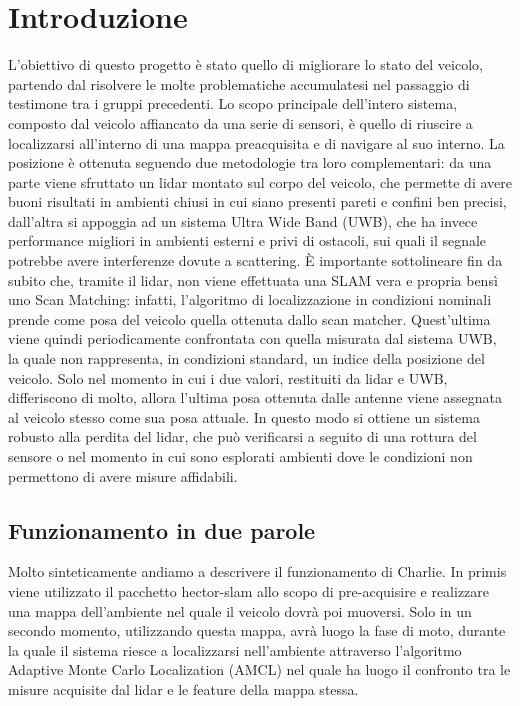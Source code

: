 
\graphicspath{{./figs/}}


	


\newpage\null\thispagestyle{empty}\newpage
\newpage
{}
\setcounter{page}{1}
\tableofcontents
\newpage

%
%


\section*{Introduzione}
L'obiettivo di questo progetto \`e stato quello di migliorare lo stato del veicolo, partendo dal risolvere le molte problematiche accumulatesi nel passaggio di testimone tra i gruppi precedenti.
Lo scopo principale dell'intero sistema, composto dal veicolo affiancato da una serie di sensori, \`e quello di riuscire a localizzarsi all'interno di una mappa 
preacquisita e di navigare al suo interno.
La posizione \`e ottenuta seguendo due metodologie tra loro complementari: da una parte viene sfruttato un lidar montato sul corpo del veicolo, che permette di 
avere buoni risultati in ambienti chiusi in cui siano presenti pareti e confini ben precisi, dall'altra si appoggia ad un sistema Ultra Wide Band (UWB), che ha 
invece performance migliori in ambienti esterni e privi di ostacoli, sui quali il segnale potrebbe avere interferenze dovute a scattering.
\`E importante sottolineare fin da subito che, tramite il lidar, non viene effettuata una SLAM vera e propria bens\`i uno Scan Matching: infatti, l'algoritmo di 
localizzazione in condizioni nominali prende come posa del veicolo quella ottenuta dallo scan matcher. 
Quest'ultima viene quindi periodicamente confrontata con quella misurata dal sistema UWB, la quale non rappresenta, in condizioni standard, un indice della posizione 
del veicolo. Solo nel momento in cui i due valori, restituiti da lidar e UWB, differiscono di molto, allora l'ultima posa ottenuta dalle antenne viene assegnata al 
veicolo stesso come sua posa attuale.
In questo modo si ottiene un sistema robusto alla perdita del lidar, che pu\`o verificarsi a seguito di una rottura del sensore o nel momento in cui sono esplorati 
ambienti dove le condizioni non permettono di avere misure affidabili.


\subsection*{Funzionamento in due parole}
Molto sinteticamente andiamo a descrivere il funzionamento di Charlie. 
In primis viene utilizzato il pacchetto hector-slam allo scopo di pre-acquisire e realizzare una mappa dell'ambiente nel quale il veicolo dovrà poi muoversi. 
Solo in un secondo momento, utilizzando questa mappa, avrà luogo la fase di moto, durante la quale il sistema riesce a localizzarsi nell'ambiente attraverso 
l'algoritmo Adaptive Monte Carlo Localization (AMCL) nel quale ha luogo il confronto tra le misure acquisite dal lidar e le feature della mappa stessa. 

